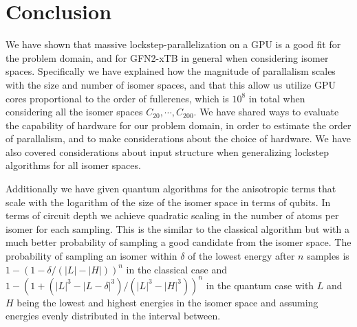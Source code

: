 \chapter{Conclusion}\label{sec:conclusion}

We have shown that massive lockstep-parallelization on a GPU is a good fit for the problem domain, and for GFN2-xTB in general when considering isomer spaces. Specifically we have explained how the magnitude of parallalism scales with the size and number of isomer spaces, and that this allow us utilize GPU cores proportional to the order of fullerenes, which is $10^8$ in total when considering all the isomer spaces \(C_{20}, \cdots, C_{200} \). We have shared ways to evaluate the capability of hardware for our problem domain, in order to estimate the order of parallalism, and to make considerations about the choice of hardware. We have also covered considerations about input structure when generalizing lockstep algorithms for all isomer spaces.

Additionally we have given quantum algorithms for the anisotropic terms that scale with the logarithm of the size of the isomer space in terms of qubits. In terms of circuit depth we achieve quadratic scaling in the number of atoms per isomer for each sampling. This is the similar to the classical algorithm but with a much better probability of sampling a good candidate from the isomer space. The probability of sampling an isomer within $\delta$ of the lowest energy after $n$ samples is $1-(1-\delta/(|L|-|H|))^n$ in the classical case and $1-(1+(|L|^3-|L-\delta|^3)/(|L|^3-|H|^3))^n$ in the quantum case with $L$ and $H$ being the lowest and highest energies in the isomer space and assuming energies evenly distributed in the interval between.
